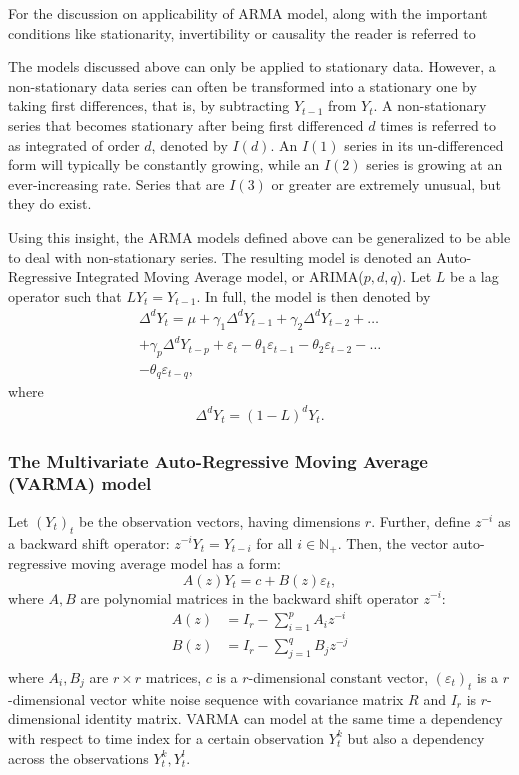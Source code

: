 \documentclass[conference,letterpaper]{IEEEtran}
\renewcommand\epsilon{\varepsilon}
\begin{document}
For the discussion on applicability of ARMA model, along with the important conditions like stationarity, invertibility or causality the reader is referred to ~\cite{BORCDAV2009}

The models discussed above can only be applied to stationary data. However, a non-stationary data series can often be transformed into a stationary one by 
taking first differences, that is, by subtracting $Y_{t-1}$ from $Y_t$. A non-stationary series that becomes stationary after being first differenced $d$ 
times is referred to as integrated of order $d$, denoted by $I(d)$. An $I(1)$ series in its un-differenced form will typically be constantly growing, while 
an $I(2)$ series is growing at an ever-increasing rate. Series that are $I(3)$ or greater are extremely unusual, but they do exist. 

Using this insight, the ARMA models defined above can be generalized to be able to deal with non-stationary series. The resulting model is denoted an 
Auto-Regressive Integrated Moving Average model, or ARIMA($p, d, q$). Let $L$ be a lag operator such that $LY_t = Y_{t-1}$. In full, the model is then 
denoted by
\begin{eqnarray*}
\Delta^dY_t = \mu + \gamma_1\Delta^dY_{t-1} + \gamma_2\Delta^dY_{t-2} + \hdots \\
+ \gamma_p\Delta^dY_{t-p} + \epsilon_t - \theta_1\epsilon_{t-1} - \theta_2\epsilon_{t-2} - \hdots \\
- \theta_q\epsilon_{t-q},
\end{eqnarray*}
where
\begin{eqnarray*}
\Delta^d Y_t = (1 - L)^dY_t.
\end{eqnarray*}

\subsubsection{The Multivariate Auto-Regressive Moving Average (VARMA) model}\label{section:varma}
Let $(Y_t)_t$ be the observation vectors, having dimensions $r$. Further, define $z^{-i}$ as a backward shift operator: $z^{-i}Y_t = Y_{t-i}$ for all $i \in \mathbb{N}_+$. Then, the vector auto-regressive moving average model has a form:
\begin{equation}\label{VARMA}
A(z)Y_t = c + B(z)\epsilon_t, 
\end{equation}
where $A,B$ are polynomial matrices in the backward shift operator $z^{-i}$:
\begin{align*}
A(z) &= I_r - \sum_{i=1}^{p} A_i z^{-i}\\
B(z) &= I_r - \sum_{j=1}^q B_j z^{-j} \\
\end{align*}
where $A_i,B_j$ are $r \times r$ matrices, $c$ is a $r$-dimensional constant vector, $(\epsilon_t)_t$ is a $r$-dimensional vector white noise sequence with covariance matrix $R$ and $I_r$ is $r$-dimensional identity matrix. VARMA can model at the same time a dependency with respect to time index for a certain observation $Y^k_t$ but also a dependency across the observations $Y^k_t, Y^l_t$.
\end{document}
